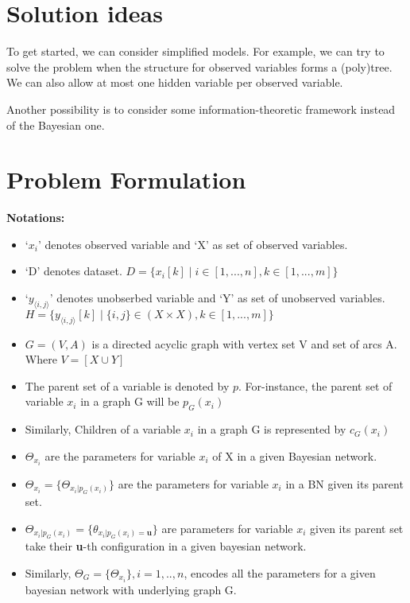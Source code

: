 \documentclass[]{article}
\begin{document}



\section{Solution ideas}

To get started, we can consider simplified models. For example, we can try to solve the problem when the structure for observed variables forms a (poly)tree. We can also allow at most one hidden variable per observed variable.

Another possibility is to consider some information-theoretic framework instead of the Bayesian one.

\section{Problem Formulation}


\textbf{Notations:}
	\begin{itemize}
		\item `$x_i$' denotes observed variable and `X' as set of observed variables.
		\item `D' denotes dataset.  $D = \lbrace x_i\left[ k\right] \mid i \in \left[ 1,...,n \right],  k \in \left[ 1,...,m \right] \rbrace$
  		\item `$y_{\langle i, j \rangle}$' denotes unobserbed variable and `Y' as set of unobserved variables. $H = \lbrace y_{\langle i, j \rangle} \left[ k\right] \mid \lbrace i, j \rbrace \in \left( X \times X \right),  k \in \left[ 1,...,m \right] \rbrace$
		\item $G = \left( V, A\right)$ is a directed acyclic graph with vertex set V and set of arcs A. Where $V = \left[X \cup Y \right]$
		\item The parent set of a variable is denoted by $p$. For-instance, the parent set of variable $x_i$ in a graph G will be $p_G\left(x_i\right)$
		\item Similarly, Children of a variable $x_i$ in a graph G is represented by $c_G\left(x_i\right)$	
		\item $\Theta_{x_i}$ are the parameters for variable $x_i$ of X in a given Bayesian network.
		\item $\Theta_{x_i}= \lbrace \Theta_{x_i | p_G \left( x_i \right) } \rbrace$ are the parameters for variable $x_i$ in a BN given its parent set.
		\item $\Theta_{x_i | p_G \left( x_i \right) } = \lbrace \theta_{x_i | p_G \left( x_i \right)=\textbf{u} } \rbrace$ are parameters for variable $x_i$ given its parent set take their \textbf{u}-th configuration in a given bayesian network. 
		\item Similarly, $\Theta_G = \lbrace	\Theta_{x_i} \rbrace, i= 1,.., n $, encodes all the parameters for a given bayesian network with underlying graph G. 
		
	\end{itemize}
\end{document}
